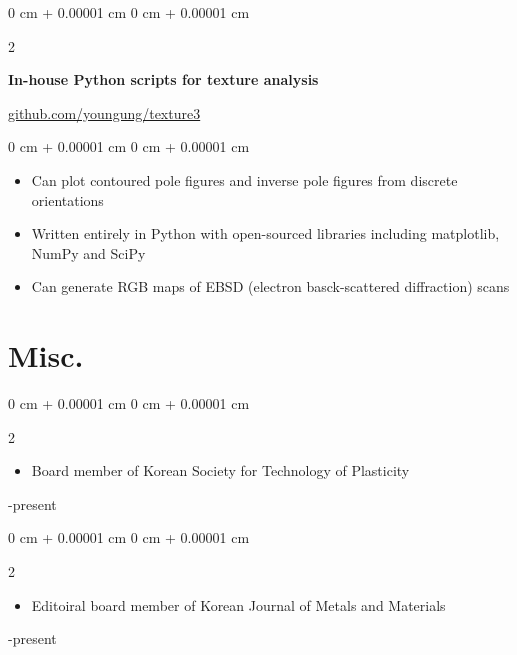 \documentclass[10pt, letterpaper]{article}
\newenvironment{highlights}{
    \begin{itemize}[
        topsep=0.10 cm,
        parsep=0.10 cm,
        partopsep=0pt,
        itemsep=0pt,
        leftmargin=0 cm + 10pt
    ]
}{
    \end{itemize}
} %
\newenvironment{onecolentry}{
    \begin{adjustwidth}{
        0 cm + 0.00001 cm
    }{
        0 cm + 0.00001 cm
    }
}{
    \end{adjustwidth}
} %
\newenvironment{twocolentry}[2][]{
    \onecolentry
    \def\secondColumn{#2}
    \setcolumnwidth{\fill, 4.5 cm}
    \begin{paracol}{2}
}{
    \switchcolumn \raggedleft \secondColumn
    \end{paracol}
    \endonecolentry
} %
\begin{document}
        \begin{twocolentry}{\href{https://github.com/youngung/texture3}{github.com/youngung/texture3}}
            \textbf{In-house Python scripts for texture analysis}
        \end{twocolentry}
        \begin{onecolentry}
            \begin{highlights}
                \item Can plot contoured pole figures and inverse pole figures from discrete orientations
                \item Written entirely in Python with open-sourced libraries including matplotlib, NumPy and SciPy
                \item Can generate RGB maps of EBSD (electron basck-scattered diffraction) scans
            \end{highlights}
        \end{onecolentry}
        \vspace{0.4 cm}

        \section{Misc.}
        \begin{twocolentry}{2023-present}
          \begin{highlights}
          \item Board member of Korean Society for Technology of Plasticity
          \end{highlights}
        \end{twocolentry}
        \vspace{0.2 cm}
        \begin{twocolentry}{2019-present}
          \begin{highlights}
          \item Editoiral board member of Korean Journal of Metals and Materials
          \end{highlights}
        \end{twocolentry}
        \vspace{0.2 cm}
        \newpage
\end{document}
